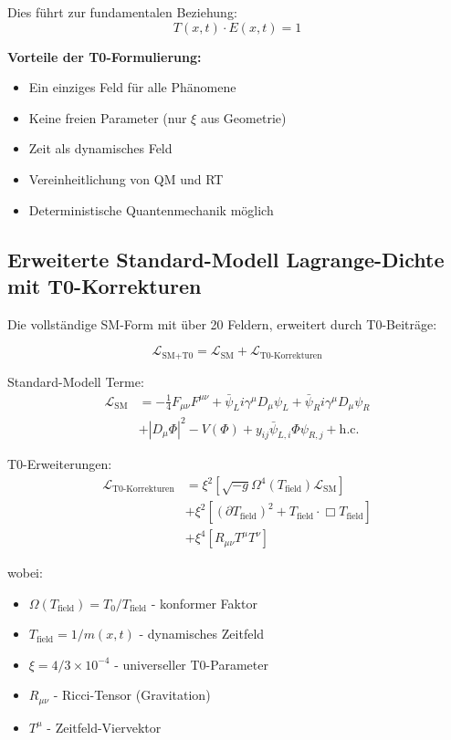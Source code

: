 \documentclass[12pt,a4paper]{article}
\begin{document}
	Dies führt zur fundamentalen Beziehung:
	\begin{equation}
		\boxed{T(x,t) \cdot E(x,t) = 1}
	\end{equation}
	
	\textbf{Vorteile der T0-Formulierung:}
	\begin{itemize}
		\item Ein einziges Feld für alle Phänomene
		\item Keine freien Parameter (nur $\xi$ aus Geometrie)
		\item Zeit als dynamisches Feld
		\item Vereinheitlichung von QM und RT
		\item Deterministische Quantenmechanik möglich
	\end{itemize}
	
	\subsection{Erweiterte Standard-Modell Lagrange-Dichte mit T0-Korrekturen}
	
	Die vollständige SM-Form mit über 20 Feldern, erweitert durch T0-Beiträge:
	
	\begin{smbox}
		\begin{equation}
			\mathcal{L}_{\text{SM+T0}} = \mathcal{L}_{\text{SM}} + \mathcal{L}_{\text{T0-Korrekturen}}
		\end{equation}
		
		Standard-Modell Terme:
		\begin{align}
			\mathcal{L}_{\text{SM}} &= -\frac{1}{4}F_{\mu\nu}F^{\mu\nu} + \bar{\psi}_L i\gamma^\mu D_\mu \psi_L + \bar{\psi}_R i\gamma^\mu D_\mu \psi_R \\
			&+ |D_\mu \Phi|^2 - V(\Phi) + y_{ij}\bar{\psi}_{L,i}\Phi\psi_{R,j} + \text{h.c.}
		\end{align}
		
		T0-Erweiterungen:
		\begin{align}
			\mathcal{L}_{\text{T0-Korrekturen}} &= \xi^2 \left[ \sqrt{-g} \Omega^4(T_{\text{field}}) \mathcal{L}_{\text{SM}} \right] \\
			&+ \xi^2 \left[ (\partial T_{\text{field}})^2 + T_{\text{field}} \cdot \Box T_{\text{field}} \right] \\
			&+ \xi^4 \left[ R_{\mu\nu} T^{\mu} T^{\nu} \right]
		\end{align}
		
		wobei:
		\begin{itemize}
			\item $\Omega(T_{\text{field}}) = T_0/T_{\text{field}}$ - konformer Faktor
			\item $T_{\text{field}} = 1/m(x,t)$ - dynamisches Zeitfeld
			\item $\xi = 4/3 \times 10^{-4}$ - universeller T0-Parameter
			\item $R_{\mu\nu}$ - Ricci-Tensor (Gravitation)
			\item $T^{\mu}$ - Zeitfeld-Viervektor
		\end{itemize}
	\end{smbox}
	
\end{document}
